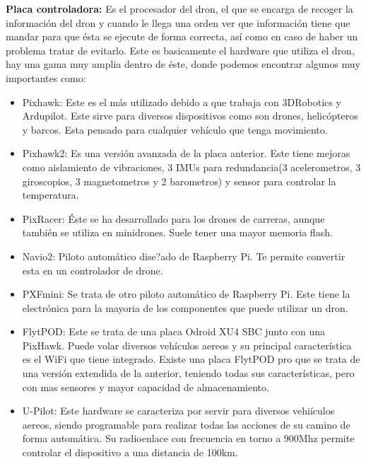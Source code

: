 \documentclass{article}
\begin{document}
\hspace{1 cm}\textbf{Placa controladora:} Es el procesador del dron, el que se encarga de recoger la informaci\'on del dron y cuando le llega una orden ver que informaci\'on tiene que mandar para que \'esta se ejecute de forma correcta, as\'i como en caso de haber un problema tratar de evitarlo. Este es basicamente el hardware que utiliza el dron, hay una gama muy amplia dentro de \'este, donde podemos encontrar algunos muy importantes como: 
	\begin{itemize}
		\item Pixhawk: Este es el m\'as utilizado debido a que trabaja con 3DRobotics y Ardupilot. Este sirve para diversos dispositivos como son drones, helic\'opteros y barcos. Esta pensado para cualquier veh\'iculo que tenga movimiento. 

		\item Pixhawk2: Es una versi\'on avanzada de la placa anterior. Este tiene mejoras como aislamiento de vibraciones, 3 IMUs para redundancia(3 acelerometros, 3 giroscopios, 3 magnetometros y 2 barometros) y sensor para controlar la temperatura. 

		\item PixRacer: \'Este se ha desarrollado para los drones de carreras, aunque tambi\'en se utiliza en minidrones. Suele tener una mayor memoria flash.

		\item Navio2: Piloto autom\'atico dise?ado de Raspberry Pi. Te permite convertir esta en un controlador de drone. 

		\item PXFmini: Se trata de otro piloto autom\'atico de Raspberry Pi. Este tiene la electr\'onica para la mayoria de los componentes que puede utilizar un dron. 

		\item FlytPOD: Este se trata de una placa Odroid XU4 SBC junto con una PixHawk. Puede volar diversos veh\'iculos aereos y su principal caracter\'istica es el WiFi que tiene integrado. Existe una placa FlytPOD pro que se trata de una versi\'on extendida de la anterior, teniendo todas sus caracter\'isticas, pero con mas sensores y mayor capacidad de almacenamiento. 

		\item U-Pilot: Este hardware se caracteriza por servir para diversos vehi\'iculos aereos, siendo programable para realizar todas las acciones de su camino de forma autom\'atica. Su radioenlace con frecuencia en torno a 900Mhz permite controlar el dispositivo a una distancia de 100km. 
	\end{itemize}
\end{document}
